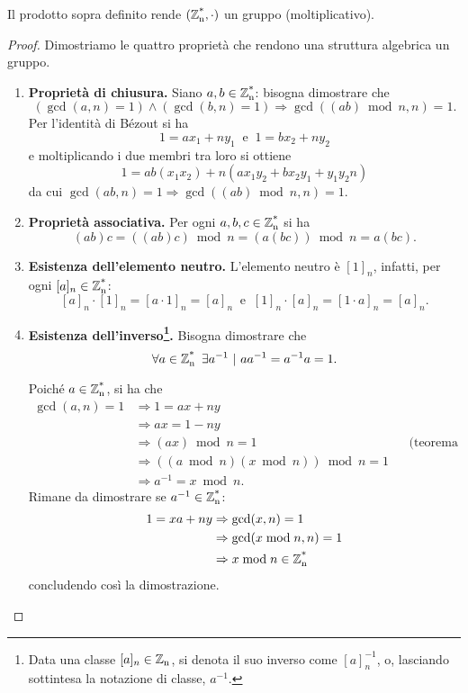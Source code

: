 \begin{proposizione}
Il prodotto sopra definito rende $(\operatorname*{\mathbb{Z}_n^*}, \cdot)$ un gruppo (moltiplicativo).
\end{proposizione}
\begin{proof}
Dimostriamo le quattro proprietà che rendono una struttura algebrica un gruppo.
\begin{enumerate}
\item \textbf{Proprietà di chiusura.} Siano $a,b\in\operatorname*{\mathbb{Z}_n^*}$: bisogna dimostrare che
\[
(\gcd(a,n)=1) \land (\gcd(b,n)=1) \Rightarrow \gcd((ab)\bmod n, n)=1.
\]
Per l'identità di Bézout si ha
\[
1=ax_1 + ny_1 \ \mbox{ e } \ 1=bx_2 + ny_2
\]
e moltiplicando i due membri tra loro si ottiene
\[
1=ab(x_1x_2)+n(ax_1y_2+bx_2y_1+y_1y_2n) 
\]
da cui $\gcd(ab,n)=1 \Rightarrow \gcd((ab)\bmod n,n)=1$.

\item \textbf{Proprietà associativa.} Per ogni $a,b,c\in\operatorname*{\mathbb{Z}_n^*}$ si ha
\[
(ab)c=((ab)c)\bmod n=(a(bc))\bmod n=a(bc).
\] 

\item \textbf{Esistenza dell'elemento neutro.} L'elemento neutro è $[1]_n$, infatti, per ogni $[a]_n\in\operatorname*{\mathbb{Z}_n^*}$:
\[
[a]_n \cdot [1]_n = [a\cdot 1]_n = [a]_n \ \mbox{ e } \  [1]_n \cdot [a]_n = [1\cdot a]_n = [a]_n.
\]

\item \textbf{Esistenza dell'inverso\footnote{Data una classe $[a]_n\in\operatorname*{\mathbb{Z}_n}$, si denota il suo inverso come $[a]_n^{-1}$, o, lasciando sottintesa la notazione di classe, $a^{-1}$.}.} Bisogna dimostrare che 
\[
\forall a\in\operatorname*{\mathbb{Z}_n^*} \ \exists a^{-1} \ | \ aa^{-1}=a^{-1}a=1.
\]

Poiché $a\in\operatorname*{\mathbb{Z}_n^*}$, si ha che
\begin{align*}
\gcd(a,n)=1 &\Rightarrow 1=ax+ny \\
&\Rightarrow ax=1-ny \\
&\Rightarrow (ax)\bmod n=1 &&\text{(teorema di divisione)} \\
&\Rightarrow ((a\bmod n)(x\bmod n))\bmod n=1 \\
&\Rightarrow a^{-1}=x\bmod n.
\end{align*}
Rimane da dimostrare se $a^{-1}\in\operatorname*{\mathbb{Z}_n^*}$:
\begin{align*}
1 = xa+ny &\Rightarrow \gcd(x,n)=1 \\
&\Rightarrow \gcd(x\bmod n, n)= 1 \\
&\Rightarrow x\bmod n \in\operatorname*{\mathbb{Z}_n^*}
\end{align*}
concludendo così la dimostrazione.
\end{enumerate}
\end{proof}

